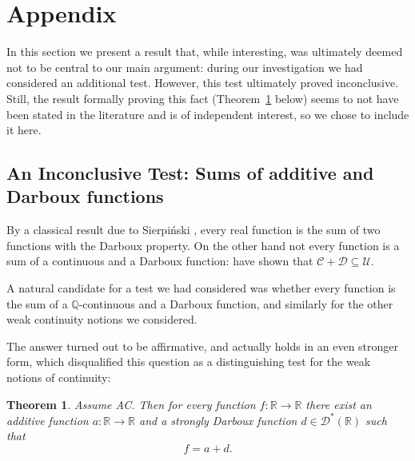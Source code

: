 \documentclass[11pt]{amsart} %
\newtheorem{theorem}{Theorem}[section]
\theoremstyle{definition}
\begin{document}
\section{Appendix}

In this section we present a result that, while interesting, was ultimately deemed not to be central to our main argument: during our investigation we had considered an additional test. However, this test  ultimately proved inconclusive. Still, the result formally proving this fact (Theorem~\ref{thm:8.1} below) seems to not have been stated in the literature and is of independent interest, so we chose to include it here.
 

\subsection{An Inconclusive Test: Sums of additive and Darboux functions}

By a classical result due to Sierpiński \cite{17}, every real function is the sum of two functions with the Darboux property. On the other hand not every function is a sum of a continuous and a Darboux function: \cite{6} have shown that $\mathcal{C}+\mathcal{D}\subseteq\mathcal{U}$. 

A natural candidate for a test we had considered was whether every function is the sum of a $\mathbb{Q}$-continuous and a Darboux function, and similarly for the other weak continuity notions we considered. 

The answer turned out to be affirmative, and actually holds in an even stronger form, which disqualified this question as a distinguishing test for the weak notions of continuity:

\begin{theorem}
\label{thm:8.1}
Assume AC. Then for every function $f:\mathbb{R}\rightarrow\mathbb{R}$ there exist an additive function $a:\mathbb{R}\rightarrow\mathbb{R}$ and a strongly Darboux function $d\in \mathcal{D}^{*}(\mathbb{R})$ such that
\begin{equation} 
f=a+d. \end{equation} 
\end{theorem}
\end{document}
